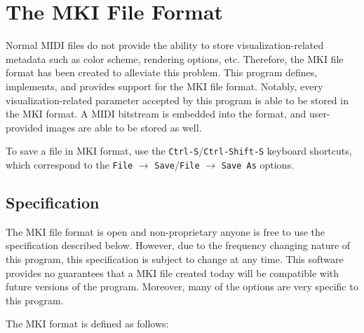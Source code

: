 \documentclass[english]{article}
\providecommand{\mi}[1]{\texttt{#1}}
\begin{document}
\section{The MKI File Format}

Normal MIDI files do not provide the ability to store visualization-related metadata such as color scheme,
rendering options, etc. Therefore, the MKI file format has been created to alleviate this problem.
This program defines, implements, and provides support for the MKI file format. Notably, every visualization-related
parameter accepted by this program is able to be stored in the MKI format. A MIDI bitstream is embedded into the format,
and user-provided images are able to be stored as well.

To save a file in MKI format, use the \mi{Ctrl-S}/\mi{Ctrl-Shift-S} keyboard shortcuts, which correspond to the 
\mi{File} $\rightarrow$ \mi{Save}/\mi{File} $\rightarrow$ \mi{Save As}
options.

\subsection{Specification}

The MKI file format is open and non-proprietary \textendash{} anyone is free to use the specification described below. However,
due to the frequency changing nature of this program, this specification is subject to change at any time. This software
provides no guarantees that a MKI file created today will be compatible with future versions of the program. Moreover,
many of the options are very specific to this program.

The MKI format is defined as follows:

\vspace{1em}
\end{document}
